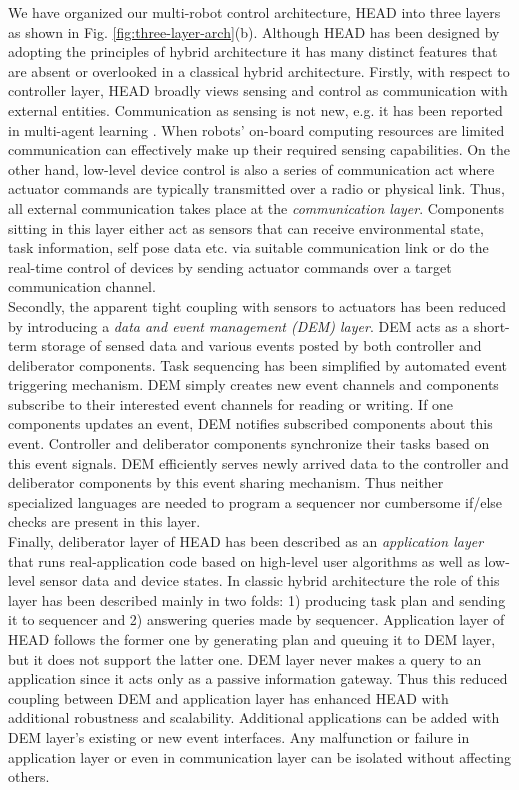 We have organized our multi-robot control architecture, HEAD into three layers as shown in Fig. \ref{fig:three-layer-arch}(b). Although HEAD has been designed by adopting the principles of hybrid architecture it has many distinct features that are absent or overlooked in a classical hybrid architecture. Firstly, with respect to controller layer, HEAD broadly views sensing and control as communication with external entities. Communication as sensing is not new, e.g. it has been reported in multi-agent learning \cite{Mataric1998}. When robots' on-board computing resources are limited communication can effectively make up their required sensing capabilities. On the other hand, low-level device control is also a series of communication act where actuator commands are typically transmitted over a radio or physical link. Thus, all external communication takes place at the {\em communication layer}. Components sitting in this layer either act as sensors that can receive environmental state, task information, self pose data etc. via suitable communication link or do the real-time control of devices by sending actuator commands over a target communication channel. \\
Secondly, the apparent tight coupling with sensors to actuators has been reduced by introducing a {\em data and event management (DEM) layer}. DEM acts as a short-term storage of sensed data and various events posted by both controller and deliberator components. Task sequencing has been simplified by automated event triggering mechanism. DEM simply creates new event channels and components subscribe to their interested event channels for reading or writing. If one components updates an event, DEM notifies subscribed components about this event. Controller and deliberator components synchronize their tasks based on this event signals. DEM efficiently serves newly arrived data to the controller and deliberator components by this event sharing mechanism. Thus neither specialized languages are needed to program a sequencer nor cumbersome if/else checks are present in this layer.\\
Finally, deliberator layer of HEAD has been described as an {\em application layer} that runs real-application code based on high-level user algorithms as well as low-level sensor data and device states. In classic hybrid architecture the role of this layer has been described mainly in two folds: 1) producing task plan and sending it to sequencer and 2) answering queries made by sequencer. Application layer of HEAD follows the former one by generating plan and queuing it to DEM layer, but it does not support the latter one. DEM layer never makes a query to an application since it acts only as a passive information gateway. Thus this reduced coupling between DEM and application layer has enhanced HEAD with additional robustness and scalability. Additional applications can be added with DEM layer's existing or new event interfaces. Any malfunction or failure in application layer or even in communication layer can be isolated without affecting others. 
